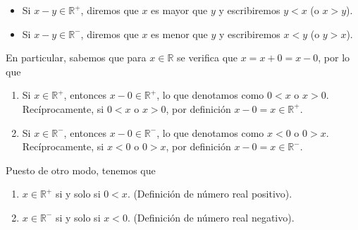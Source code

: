 \documentclass[11pt]{article}
\newcommand{\R}{\mathbb{R}}
\begin{document}
\pagebreak

\begin{itemize}
\item Si $x-y\in \R^+$, diremos que $x$ es mayor que $y$ y escribiremos $y<x$ (o $x>y$).%
\item Si $x-y\in \R^-$, diremos que $x$ es menor que $y$ y escribiremos $x<y$ (o $y>x$).%
\end{itemize}

En particular, sabemos que para $x\in \R$ se verifica que $x=x+0=x-0$, por lo que
\vspace{-1em}\begin{enumerate}[label=\roman*)]
\item Si $x\in \R^+$, entonces $x-0\in \R^+$, lo que denotamos como $0<x$ o $x>0$. Recíprocamente, si $0<x$ o $x>0$, por definición $x-0=x\in \R^+$.
\item Si $x\in \R^-$, entonces $x-0\in \R^-$, lo que denotamos como $x<0$ o $0>x$. Recíprocamente, si $x<0$ o $0>x$, por definición $x-0=x\in \R^-$.
\end{enumerate}\vspace{-1em}

Puesto de otro modo, tenemos que \vspace{-1em}\begin{enumerate}[label=\roman*)]
    \item $x\in \R^+$ si y solo si $0<x$. (Definición de número real positivo).
    \item $x\in \R^-$ si y solo si $x<0$. (Definición de número real negativo).
\end{enumerate}\vspace{-1em}
\end{document}
